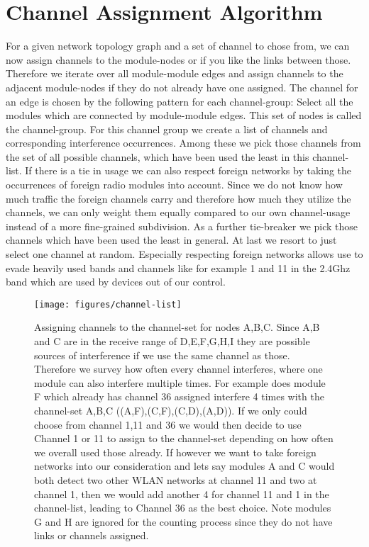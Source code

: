      \newpage

  \section{Channel Assignment Algorithm}
    For a given network topology graph and a set of channel to chose from, we can now assign channels to the module-nodes or if you like the links
    between those. Therefore we iterate over all module-module edges and assign channels to the adjacent module-nodes if they do not already have one assigned.
    The channel for an edge is chosen by the following pattern for each channel-group:
    Select all the modules which are connected by module-module edges. This set of nodes is called the channel-group.
    For this channel group we create a list of channels and corresponding interference occurrences.
    Among these we pick those channels from the set of all possible channels, which have been used the least in this channel-list. If there is a tie in usage
    we can also respect foreign networks by taking the occurrences of foreign radio modules into account. Since we do not know how much traffic the foreign 
    channels carry and therefore how much they utilize the channels, we can only weight them equally compared to our own channel-usage instead of a more fine-grained subdivision.
    As a further tie-breaker we pick those channels which have been used the least in general.
    At last we resort to just select one channel at random.
    Especially respecting foreign networks allows use to evade heavily used
    bands and channels like for example 1 and 11 in the 2.4Ghz band which are used by devices out of our control.
    
    \newpage
    
    \begin{figure}[h!]
      \centering
      \texttt{[image: figures/channel-list]}
      \caption{Assigning channels to the channel-set for nodes A,B,C. Since A,B and C are in the receive range of D,E,F,G,H,I they are possible sources
	of interference if we use the same channel as those. Therefore we survey how often every channel interferes, where one module can also interfere multiple times.
	For example does module F which already has channel 36 assigned interfere 4 times with the channel-set A,B,C ((A,F),(C,F),(C,D),(A,D)). If we only could choose from 
	channel 1,11 and 36 we would then decide to use Channel 1 or 11 to assign to the channel-set depending on how often we overall used those already.
	If however we want to take foreign networks into our consideration and lets say modules A and C would both detect two other \ac{WLAN} networks at channel 11 and two
	at channel 1, then we would add another 4 for channel 11 and 1 in the channel-list, leading to Channel 36 as the best choice. Note modules G and H are ignored 
	for the counting process since they do not have links or channels assigned.}
      \label{fig:channel-list}
    \end{figure}
    
